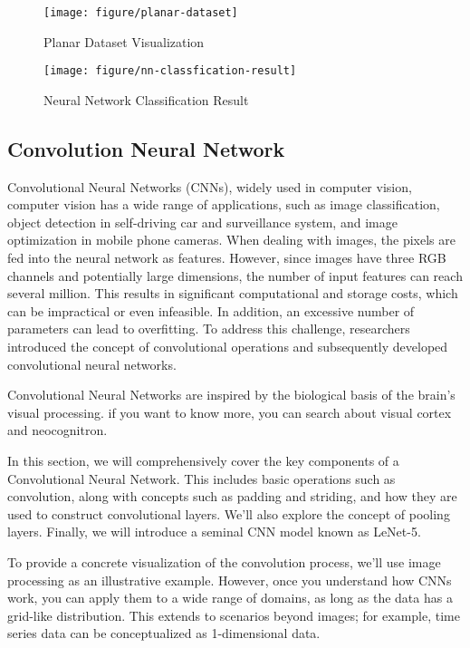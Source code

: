 \documentclass{article}
\begin{document}
\begin{figure}[htbp]
    \centering
    \begin{minipage}[t]{0.48\textwidth}
    \centering
    \texttt{[image: figure/planar-dataset]}
    \caption{Planar Dataset Visualization}
    \end{minipage}
    \begin{minipage}[t]{0.48\textwidth}
    \centering
    \texttt{[image: figure/nn-classfication-result]}
    \caption{Neural Network Classification Result}
    \end{minipage}
    \end{figure}
    

    \newpage
	\subsection{Convolution Neural Network}
    
    Convolutional Neural Networks (CNNs), widely used in computer vision, computer vision has a wide range of applications, such as image classification, object detection in self-driving car and surveillance system, and image optimization in mobile phone cameras. When dealing with images, the pixels are fed into the neural network as features. However, since images have three RGB channels and potentially large dimensions, the number of input features can reach several million. This results in significant computational and storage costs, which can be impractical or even infeasible. In addition, an excessive number of parameters can lead to overfitting. To address this challenge, researchers introduced the concept of convolutional operations and subsequently developed convolutional neural networks.

Convolutional Neural Networks are inspired by the biological basis of the brain's visual processing.  if you want to know more, you can search about visual cortex and neocognitron.

In this section, we will comprehensively cover the key components of a Convolutional Neural Network. This includes basic operations such as convolution, along with concepts such as padding and striding, and how they are used to construct convolutional layers. We'll also explore the concept of pooling layers. Finally, we will introduce a seminal CNN model known as LeNet-5.

To provide a concrete visualization of the convolution process, we'll use image processing as an illustrative example. However, once you understand how CNNs work, you can apply them to a wide range of domains, as long as the data has a grid-like distribution. This extends to scenarios beyond images; for example, time series data can be conceptualized as 1-dimensional data.
\end{document}
